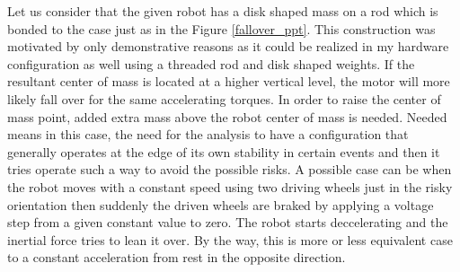 \documentclass[12pt,english]{article}
\begin{document}
Let us consider that the given robot has a disk shaped mass on a rod which is bonded to the case just as in the Figure \ref{fallover_ppt}. This construction was motivated by only demonstrative reasons as it could be realized in my hardware configuration as well using a threaded rod and disk shaped weights. If the resultant center of mass is located at a higher vertical level, the motor will more likely fall over for the same accelerating torques. In order to raise the center of mass point, added extra mass above the robot center of mass is needed. Needed means in this case, the need for the analysis to have a configuration that generally operates at the edge of its own stability in certain events and then it tries operate such a way to avoid the possible risks. A possible case can be when the robot moves with a constant speed using two driving wheels just in the risky orientation then suddenly the driven wheels are braked by applying a voltage step from a given constant value to zero. The robot starts deccelerating and the inertial force tries to lean it over. By the way, this is more or less equivalent case to a constant acceleration from rest in the opposite direction.
\end{document}
